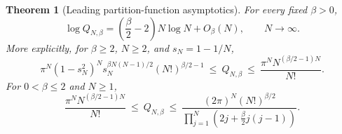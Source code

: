 \documentclass[11pt,a4paper]{article}
\numberwithin{equation}{section}
\newtheorem{theorem}{Theorem}[section]
\theoremstyle{definition}
\theoremstyle{remark}
\begin{document}
\begin{theorem}[Leading partition-function asymptotics]
\label{thm:partition-leading}
For every fixed $\beta>0$,
\begin{equation}
 \log Q_{N,\beta}
 =\left(\frac\beta2-2\right)N\log N+O_\beta(N),
 \qquad N\longrightarrow\infty.
 \label{eq:partition-leading}
\end{equation}
More explicitly, for $\beta\geq2$, $N\geq2$, and $s_N=1-1/N$,
\begin{equation}
 \pi^N(1-s_N^2)^N s_N^{\beta N(N-1)/2}
       (N!)^{\beta/2-1}
 \ \leq\ Q_{N,\beta}
 \ \leq\ \frac{\pi^N N^{(\beta/2-1)N}}{N!}.
 \label{eq:partition-bounds}
\end{equation}
For $0<\beta\leq2$ and $N\geq1$,
\begin{equation}
 \frac{\pi^N N^{(\beta/2-1)N}}{N!}
 \ \leq\ Q_{N,\beta}
 \ \leq\ \frac{(2\pi)^N(N!)^{\beta/2}}
 {\displaystyle\prod_{j=1}^N\left(2j+\frac\beta2j(j-1)\right)}.
 \label{eq:partition-bounds-low-beta}
\end{equation}
\end{theorem}
\end{document}
